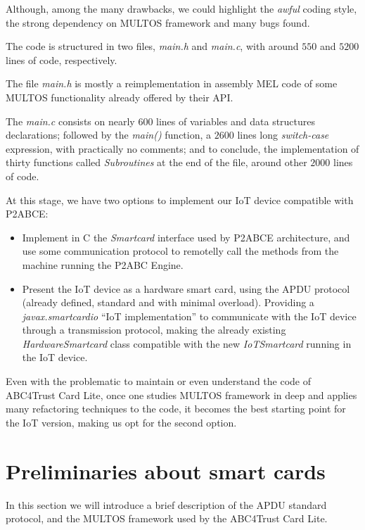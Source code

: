 Although, among the many drawbacks, we could highlight the \textit{awful} coding style, the strong dependency on MULTOS framework and many bugs found. 

The code is structured in two files, \textit{main.h} and \textit{main.c}, with around $550$ and $5200$ lines of code, respectively.

The file \textit{main.h} is mostly a reimplementation in assembly MEL code of some MULTOS functionality already offered by their API.

The \textit{main.c} consists on nearly $600$ lines of variables and data structures declarations; followed by the \textit{main()} function, a $2600$ lines long \textit{switch-case} expression, with practically no comments; and to conclude, the implementation of thirty functions called \textit{Subroutines} at the end of the file, around other $2000$ lines of code.

\hfil

At this stage, we have two options to implement our IoT device compatible with P2ABCE:

\begin{itemize}
	\item Implement in C the \textit{Smartcard} interface used by P2ABCE architecture, and use some communication protocol to remotelly call the methods from the machine running the P2ABC Engine.
	\item Present the IoT device as a hardware smart card, using the APDU protocol (already defined, standard and with minimal overload). Providing a \textit{javax.smartcardio} ``IoT implementation'' to communicate with the IoT device through a transmission protocol, making the already existing \textit{HardwareSmartcard} class compatible with the new \textit{IoTSmartcard} running in the IoT device.
\end{itemize}

Even with the problematic to maintain or even understand the code of ABC4Trust Card Lite, once one studies MULTOS framework in deep and applies many refactoring techniques to the code, it becomes the best starting point for the IoT version, making us opt for the second option.





\section{Preliminaries about smart cards}

In this section we will introduce a brief description of the APDU standard protocol, and the MULTOS framework used by the ABC4Trust Card Lite.


